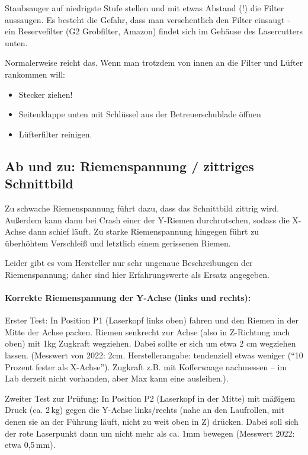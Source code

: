 \documentclass{\basedir/fablab-document}
\begin{document}
	 Staubsauger auf niedrigste Stufe stellen und mit etwas Abstand (!) die Filter aussaugen. Es besteht die Gefahr, dass man versehentlich den Filter einsaugt - ein Reservefilter (G2 Grobfilter, Amazon) findet sich im Gehäuse des Lasercutters unten.

	Normalerweise reicht das. Wenn man trotzdem von innen an die Filter und Lüfter rankommen will:
	\begin{itemize}
		\item Stecker ziehen!
		\item Seitenklappe unten mit Schlüssel aus der Betreuerschublade öffnen
		\item Lüfterfilter reinigen.
	\end{itemize}

\subsection{Ab und zu: Riemenspannung / zittriges Schnittbild}
	Zu schwache Riemenspannung führt dazu, dass das Schnittbild zittrig wird. Außerdem kann dann bei Crash einer der Y-Riemen durchrutschen, sodass die X-Achse dann schief läuft. Zu starke Riemenspannung hingegen führt zu überhöhtem Verschleiß und letztlich einem gerissenen Riemen.

	Leider gibt es vom Hersteller nur sehr ungenaue Beschreibungen der Riemenspannung; daher sind hier Erfahrungswerte als Ersatz angegeben.

	\paragraph{Korrekte Riemenspannung der Y-Achse (links und rechts):} Erster Test: In Position P1 (Laserkopf links oben) fahren und den Riemen in der Mitte der Achse packen. Riemen senkrecht zur Achse (also in Z-Richtung nach oben) mit 1kg Zugkraft wegziehen. Dabei sollte er sich um etwa 2 cm wegziehen lassen. (Messwert von 2022: 2cm. Herstellerangabe: tendenziell etwas weniger (\enquote{10 Prozent fester als X-Achse}). Zugkraft z.B. mit Kofferwaage nachmessen -- im Lab derzeit nicht vorhanden, aber Max kann eine ausleihen.).

	Zweiter Test zur Prüfung: In Position P2 (Laserkopf in der Mitte) mit mäßigem Druck (ca. 2\,kg) gegen die Y-Achse links/rechts (nahe an den Laufrollen, mit denen sie an der Führung läuft, nicht zu weit oben in Z) drücken. Dabei soll sich der rote Laserpunkt dann um nicht mehr als ca. 1mm bewegen (Messwert 2022: etwa 0,5\,mm).
\end{document}

